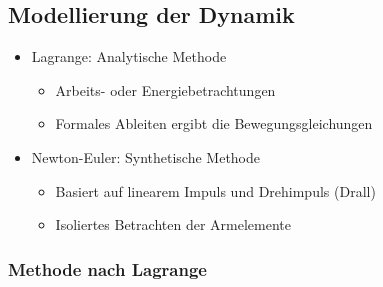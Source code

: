 \documentclass[paper=a4, fontsize=11pt]{scrartcl} %
\numberwithin{equation}{section} %
\numberwithin{figure}{section} %
\numberwithin{table}{section} %
\begin{document}
\subsection{Modellierung der Dynamik}

\begin{itemize}
\item Lagrange: Analytische Methode
\begin{itemize}
\item Arbeits- oder Energiebetrachtungen
\item Formales Ableiten ergibt die Bewegungsgleichungen
\end{itemize}
\item Newton-Euler: Synthetische Methode
\begin{itemize}
\item Basiert auf linearem Impuls und Drehimpuls (Drall)
\item Isoliertes Betrachten der Armelemente
\end{itemize}
\end{itemize}

\subsubsection{Methode nach Lagrange}
\end{document}
